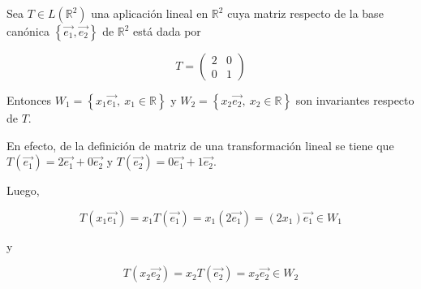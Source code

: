 \bigskip

\begin{example}

Sea $T\in L(\mathbb{R}^2)$ una aplicación lineal en $\mathbb{R}^2$ cuya matriz respecto de la base canónica $\left\{\vec{e_1} , \vec{e_2}\right\}$ de $\mathbb{R}^2$ está dada por 


$$T=\left(\begin{array}{cc}  2 & 0  \\ 0 &  1
\end{array}
\right)$$

\bigskip

Entonces $W_1=\left\{x_1\vec{e_1} ,~ x_1\in \mathbb{R}\right\}$ y $W_2=\left\{x_2\vec{e_2} ,~ x_2\in \mathbb{R}\right\}$ son invariantes respecto de $T$. 


\bigskip

En efecto, de la definición de matriz de una transformación lineal se tiene que $T(\vec{e_1})=2 \vec{e_1} + 0 \vec{e_2}$ y $T(\vec{e_2})=0 \vec{e_1} + 1 \vec{e_2}$.

\bigskip
Luego, 

$$T(x_1\vec{e_1})=x_1T(\vec{e_1})=x_1(2\vec{e_1})=(2x_1)\vec{e_1}\in W_1$$

y

$$T(x_2\vec{e_2})=x_2T(\vec{e_2})=x_2\vec{e_2}\in W_2$$

\end{example}
\bigskip

